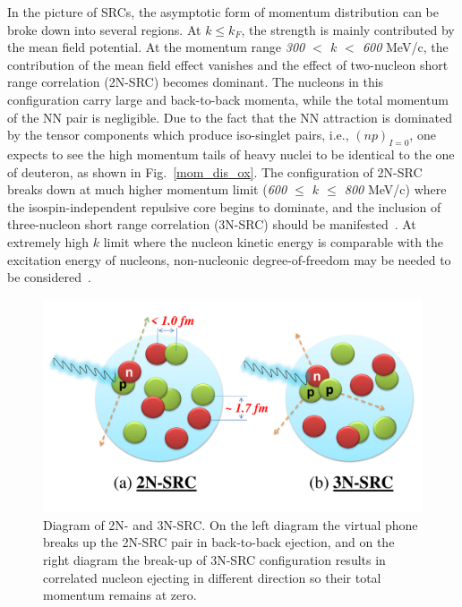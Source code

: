 In the picture of SRCs, the asymptotic form of momentum distribution can be broke down into several regions. At $k\leq k_{F}$, the strength is mainly contributed by the mean field potential. At the momentum range \emph{300 $<$ $k$ $<$ 600} MeV/c, the contribution of the mean field effect vanishes and the effect of two-nucleon short range correlation (2N-SRC) becomes dominant. The nucleons in this configuration carry large and back-to-back momenta, while the total momentum of the NN pair is negligible. Due to the fact that the NN attraction is dominated by the tensor components which produce iso-singlet pairs, i.e., $(np)_{I=0}$, one expects to see the high momentum tails of heavy nuclei to be identical to the one of deuteron, as shown in Fig.~\ref{mom_dis_ox}. The configuration of 2N-SRC breaks down at much higher momentum limit (\emph{600 $\leq$ $k$ $\leq$ 800} MeV/c) where the isospin-independent repulsive core begins to dominate, and the inclusion of three-nucleon short range correlation (3N-SRC) should be manifested~\cite{src_john}. At extremely high $k$ limit where the nucleon kinetic energy is comparable with the excitation energy of nucleons, non-nucleonic degree-of-freedom may be needed to be considered~\cite{src_john}.
\begin{figure}[!ht]
  \begin{center}
    \includegraphics[type=pdf,ext=.pdf,read=.pdf,width=0.80\linewidth]{./figures/physics/2NSRC3NSRC}
    \caption[Diagrams of 2N- and 3N-SRC]{\footnotesize{Diagram of 2N- and 3N-SRC. On the left diagram the virtual phone breaks up the 2N-SRC pair in back-to-back ejection, and on the right diagram the break-up of 3N-SRC configuration results in correlated nucleon ejecting in different direction so their total momentum remains at zero.}}
    \label{2nsrc3nsrc}
  \end{center}
\end{figure}


